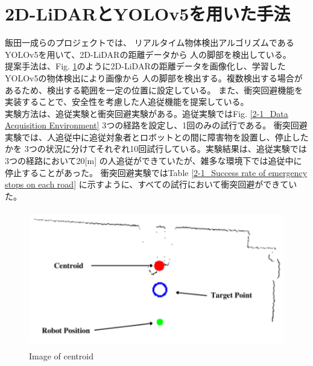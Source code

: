 \section{2D-LiDARとYOLOv5を用いた手法}
飯田一成らのプロジェクト\cite{深層学習を用いた人追従機能の開発}では、
リアルタイム物体検出アルゴリズムであるYOLOv5を用いて、2D-LiDARの距離データから
人の脚部を検出している。\\ \indent
提案手法は、Fig. \ref{2-1_Image of centroid}のように2D-LiDARの距離データを画像化し、学習したYOLOv5の物体検出により画像から
人の脚部を検出する。複数検出する場合があるため、検出する範囲を一定の位置に設定している。
また、衝突回避機能を実装することで、安全性を考慮した人追従機能を提案している。\\ \indent
実験方法は、追従実験と衝突回避実験がある。追従実験ではFig. \ref{2-1_Data Acquisition Environment} 3つの経路を設定し、1回のみの試行である。
衝突回避実験では、人追従中に追従対象者とロボットとの間に障害物を設置し、停止したかを
3つの状況に分けてそれぞれ10回試行している。実験結果は、追従実験では3つの経路において20[m]
の人追従ができていたが、雑多な環境下では追従中に停止することがあった。
衝突回避実験ではTable \ref{2-1_Success rate of emergency stops on each road}
に示すように、すべての試行において衝突回避ができていた。

\begin{figure}[h]
  \begin{center}
  \includegraphics[height=60mm,clip]{figure/2-1_Image-of-centroid.png}
  \caption{Image of centroid\cite{深層学習を用いた人追従機能の開発}}
  \label{2-1_Image of centroid}
  \end{center}
\end{figure}

